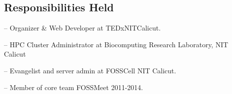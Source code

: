 \documentclass[margin,line]{resume}
\begin{document}
\begin{resume}
    \section{\mysidestyle Responsibilities Held } 
	\begin{list2}
	\item[--] Organizer \& Web Developer at TEDxNITCalicut.
	\item[--] HPC Cluster Administrator at Biocomputing Research Laboratory, NIT Calicut
	\item[--] Evangelist and server admin at FOSSCell NIT Calicut.	
	\item[--] Member of core team FOSSMeet 2011-2014.
	
	
	\end{list2}
%
%



\end{resume}
\end{document}
